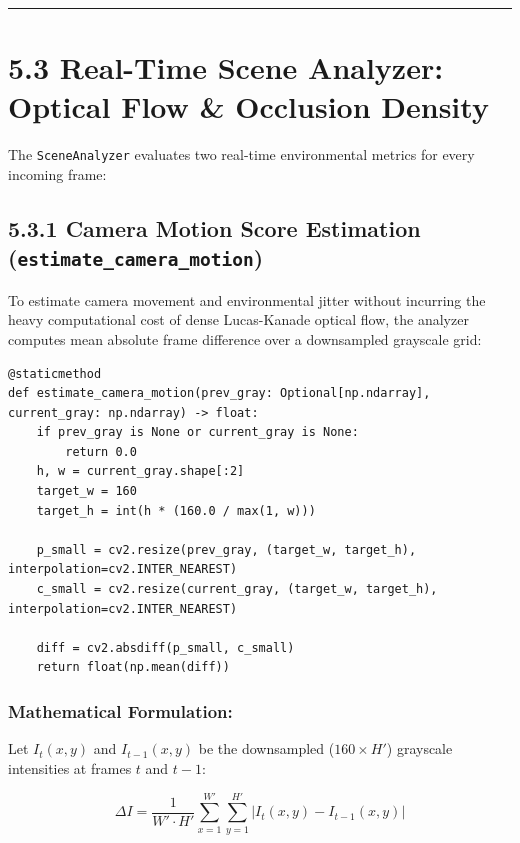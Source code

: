 \begin{center}\rule{0.5\linewidth}{0.5pt}\end{center}

\section{5.3 Real-Time Scene Analyzer: Optical Flow \& Occlusion
Density}\label{real-time-scene-analyzer-optical-flow-occlusion-density}

The \texttt{SceneAnalyzer} evaluates two real-time environmental metrics
for every incoming frame:

\subsection{\texorpdfstring{5.3.1 Camera Motion Score Estimation
(\texttt{estimate\_camera\_motion})}{5.3.1 Camera Motion Score Estimation (estimate\_camera\_motion)}}\label{camera-motion-score-estimation-estimate_camera_motion}

To estimate camera movement and environmental jitter without incurring
the heavy computational cost of dense Lucas-Kanade optical flow, the
analyzer computes mean absolute frame difference over a downsampled
grayscale grid:

\begin{verbatim}
@staticmethod
def estimate_camera_motion(prev_gray: Optional[np.ndarray], current_gray: np.ndarray) -> float:
    if prev_gray is None or current_gray is None:
        return 0.0
    h, w = current_gray.shape[:2]
    target_w = 160
    target_h = int(h * (160.0 / max(1, w)))
    
    p_small = cv2.resize(prev_gray, (target_w, target_h), interpolation=cv2.INTER_NEAREST)
    c_small = cv2.resize(current_gray, (target_w, target_h), interpolation=cv2.INTER_NEAREST)
    
    diff = cv2.absdiff(p_small, c_small)
    return float(np.mean(diff))
\end{verbatim}

\subsubsection{Mathematical
Formulation:}\label{mathematical-formulation}

Let \(I_{t}(x, y)\) and \(I_{t-1}(x, y)\) be the downsampled
(\(160 \times H'\)) grayscale intensities at frames \(t\) and \(t-1\):

\[\Delta I = \frac{1}{W' \cdot H'} \sum_{x=1}^{W'} \sum_{y=1}^{H'} \left| I_t(x, y) - I_{t-1}(x, y) \right|\]

